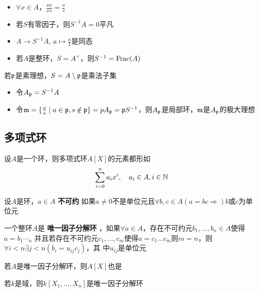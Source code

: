 \documentclass[11pt]{article}
\begin{document}
\begin{remark}
\begin{itemize}
\item \(\forall x\in A\)，\(\frac{xa}{xs}=\frac{a}{s}\)
\item 若\(S\)有零因子，则\(S^{-1}A=0\)平凡
\item \(A\to S^{-1}A\), \(a\mapsto\frac{a}{1}\)是同态
\item 若\(A\)是整环，\(S=A^\times\)，则\(S^{-1}=\operatorname{Frac}(A)\)
\end{itemize}
\end{remark}

\begin{examplle}[]
若\(\mathfrak{p}\)是素理想，\(S=A\setminus \mathfrak{p}\)是乘法子集
\begin{itemize}
\item 令\(A_{\mathfrak{p}}=S^{-1}A\)
\item 令\(\mathfrak{m}=\{\frac{a}{s}\mid a\in\mathfrak{p},s\notin\mathfrak{p}\}=pA_{\mathfrak{p}}=\mathfrak{p} S^{-1}\)，则\(A_{\mathfrak{p}}\)是局部环，\(\mathfrak{m}\)是\(A_{\mathfrak{p}}\)的极大理想
\end{itemize}
\end{examplle}



\subsection{多项式环}
\label{sec:orgc0a0e54}
设\(A\)是一个环，则多项式环\(A[X]\)的元素都形如
\begin{equation*}
\sum_{i=0}^na_ix^i,\quad a_i\in A,i\in\mathbb{N}
\end{equation*}

\begin{definition}[]
设\(A\)是环，\(a\in A\) \textbf{不可约} 如果\(a\neq 0\)不是单位元且\(\forall b,c\in A(a=bc\Rightarrow) b\)或\(c\)为单位元

一个整环\(A\)是 \textbf{唯一因子分解环} ，如果\(\forall a\in A\)，存在不可约元\(b_1,\dots,b_n\in A\)使得\(a=b_1\dotsb_n\)
并且若存在不可约元\(c_1,\dots,c_m\)使得\(a=c_1\dots c_m\)则\(m=n\)，则\(\forall i<n\exists j<n(b_i=u_{ij}c_j)\)，其
中\(u_{ij}\)是单位元
\end{definition}

\begin{proposition}[]
若\(A\)是唯一因子分解环，则\(A[X]\)也是
\end{proposition}

\begin{corollary}[]
若\(k\)是域，则\(k[X_1,\dots,X_n]\)是唯一因子分解环
\end{corollary}
\end{document}
